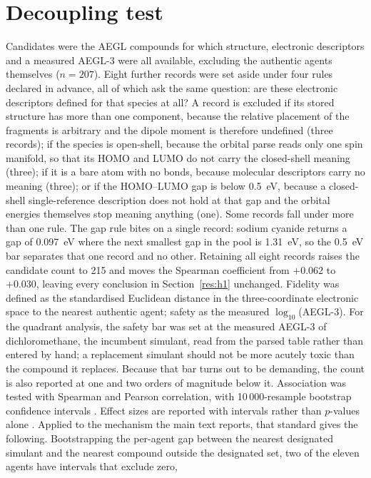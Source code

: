 \documentclass[11pt,a4paper]{article}
\begin{document}
\section{Decoupling test}
\label{meth:decoupling}
Candidates were the AEGL compounds for which structure, electronic descriptors
and a measured AEGL-3 were all available, excluding the authentic agents
themselves ($n=207$). Eight further records were set aside under four rules
declared in advance, all of which ask the same question: are these electronic
descriptors defined for that species at all? A record is excluded if
its stored structure has more than one component, because the relative placement
of the fragments is arbitrary and the dipole moment is therefore undefined
(three records); if the species is open-shell, because the orbital parse reads
only one spin manifold, so that its HOMO and LUMO do not carry the
closed-shell meaning (three); if it is a bare atom with no
bonds, because molecular descriptors carry no meaning (three); or if the
HOMO--LUMO gap is below 0.5~eV, because a closed-shell single-reference
description does not hold at that gap and the orbital energies themselves stop
meaning anything (one). Some records fall under more than one
rule. The gap rule bites on a single record: sodium cyanide returns
a gap of 0.097~eV where the next smallest gap in the pool is 1.31~eV, so the
0.5~eV bar separates that one record and no other. Retaining all eight
records raises the candidate count to 215 and moves the Spearman coefficient
from $+0.062$ to $+0.030$, leaving
every conclusion in Section~\ref{res:h1} unchanged. Fidelity was defined as the standardised
Euclidean distance in the three-coordinate electronic space to the nearest
authentic agent; safety as the measured $\log_{10}$(AEGL-3). For the quadrant analysis, the safety bar
was set at the measured AEGL-3 of dichloromethane, the incumbent
simulant, read from the parsed table rather than entered by hand; a replacement
simulant should not be more acutely toxic than the compound it replaces. Because
that bar turns out to be demanding, the count is also reported at one and two
orders of magnitude below it. Association was tested with Spearman and
Pearson correlation, with 10\,000-resample bootstrap confidence intervals
\cite{efron1986}. Effect sizes are reported with intervals rather than
$p$-values alone \cite{nakagawa2007}. Applied to the mechanism the main text
reports, that standard gives the following. Bootstrapping the per-agent gap
between the nearest designated simulant and the nearest compound outside the
designated set, two of the eleven agents have intervals that exclude zero,
\end{document}
